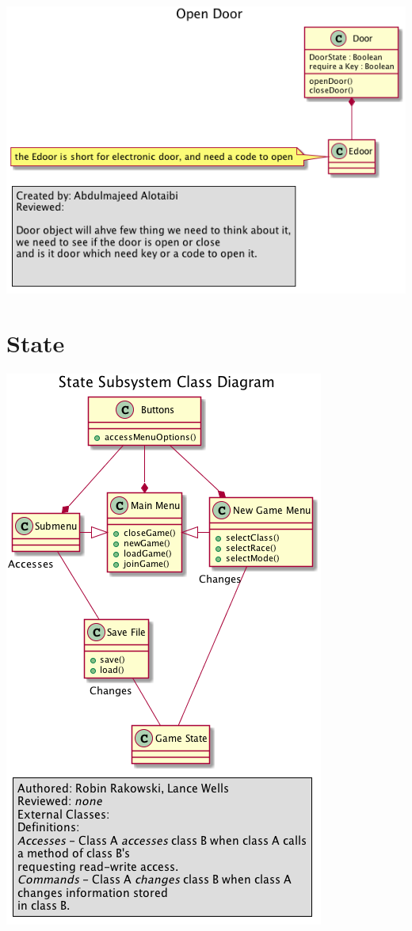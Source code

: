 \documentclass[12pt]{article}
\begin{document}
\includegraphics[width=\textwidth]{overworld-4.png}

\section{State}
\includegraphics[height=\textheight]{state.png}
\end{document}
